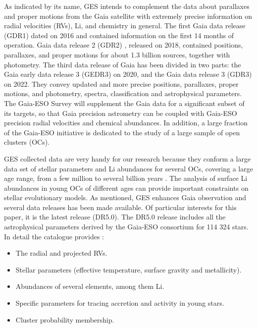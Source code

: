 \documentclass[fleqn,usenatbib]{mnras}
\begin{document}
As indicated by its name, GES intends to complement the data about parallaxes and proper motions from the Gaia satellite \citep{Mignard2005} with extremely precise information on radial velocities (RVs), Li, and chemistry in general. The first Gaia data release (GDR1) \citep{Brown2016} dated on 2016 and contained information on the first 14 months of operation. Gaia data release 2 (GDR2) \citep{Brown2018}, released on 2018, contained positions, parallaxes, and proper motions for about 1.3 billion sources, together with photometry. The third data release of Gaia has been divided in two parts: the Gaia early data release 3 (GEDR3) \citep{Brown2021} on 2020, and the Gaia data release 3 (GDR3) \citep{Brown2022} on 2022. They convey updated and more precise positions, parallaxes, proper motions, and photometry, spectra, classification and astrophysical parameters. The Gaia-ESO Survey will supplement the Gaia data for a significant subset of its targets, so that Gaia precision astrometry can be coupled with Gaia-ESO precision radial velocities and chemical abundances. In addition, a large fraction of the Gaia-ESO initiative is dedicated to the study of a large sample of open clusters (OCs).\par

GES collected data are very handy for our research because they conform a large data set of stellar parameters and Li abundances for several OCs, covering a large age range, from a few million to several billion years \citep{Dumont2021}. The analysis of surface Li abundances in young OCs of different ages can provide important constraints on stellar evolutionary models. As mentioned, GES enhances Gaia observation and several data releases has been made available. Of particular interests for this paper, it is the  latest release (DR5.0). The DR5.0 release includes all the astrophysical parameters derived by the Gaia-ESO consortium for 114 324 stars. In detail the catalogue provides \citep{Gilmore2022}:
\begin{itemize}
    \item The radial and projected RVs.
    \item Stellar parameters (effective temperature, surface gravity and metallicity).
    \item Abundances of several elements, among them Li.
    \item Specific parameters for tracing accretion and activity in young stars.
    \item Cluster probability membership.  
\end{itemize}
\end{document}
